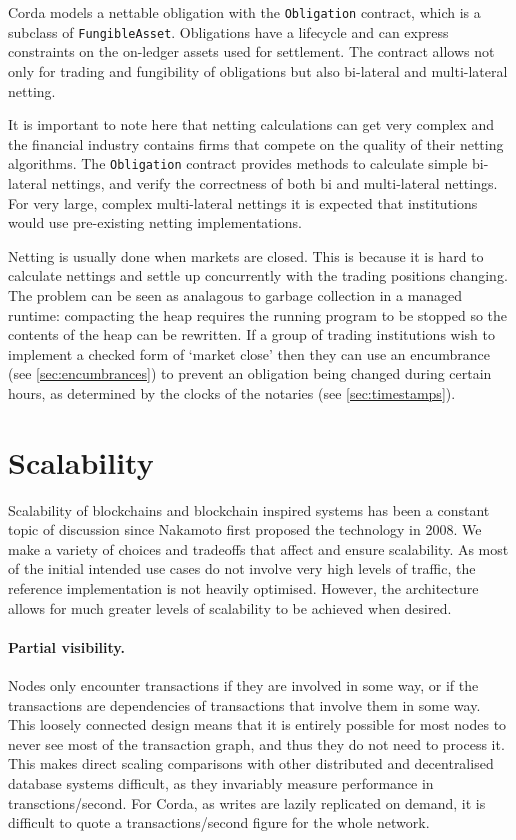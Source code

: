 \documentclass{article}
\begin{document}
Corda models a nettable obligation with the \texttt{Obligation} contract, which is a subclass of
\texttt{FungibleAsset}. Obligations have a lifecycle and can express constraints on the on-ledger assets used
for settlement. The contract allows not only for trading and fungibility of obligations but also bi-lateral and
multi-lateral netting.

It is important to note here that netting calculations can get very complex and the financial industry contains
firms that compete on the quality of their netting algorithms. The \texttt{Obligation} contract provides methods
to calculate  simple bi-lateral nettings, and verify the correctness of both bi and multi-lateral nettings. For
very large, complex multi-lateral nettings it is expected that institutions would use pre-existing netting
implementations.

Netting is usually done when markets are closed. This is because it is hard to calculate nettings and settle up
concurrently with the trading positions changing. The problem can be seen as analagous to garbage collection in
a managed runtime: compacting the heap requires the running program to be stopped so the contents of the heap
can be rewritten. If a group of trading institutions wish to implement a checked form of `market close' then they
can use an encumbrance (see \cref{sec:encumbrances}) to prevent an obligation being changed during certain hours,
as determined by the clocks of the notaries (see \cref{sec:timestamps}).

\section{Scalability}

Scalability of blockchains and blockchain inspired systems has been a constant topic of discussion since Nakamoto
first proposed the technology in 2008. We make a variety of choices and tradeoffs that affect and
ensure scalability. As most of the initial intended use cases do not involve very high levels of traffic, the
reference implementation is not heavily optimised. However, the architecture allows for much greater levels of
scalability to be achieved when desired.

\paragraph{Partial visibility.}Nodes only encounter transactions if they are involved in some way, or if the
transactions are dependencies of transactions that involve them in some way. This loosely connected
design means that it is entirely possible for most nodes to never see most of the transaction graph, and thus
they do not need to process it. This makes direct scaling comparisons with other distributed and
decentralised database systems difficult, as they invariably measure performance in transctions/second.
For Corda, as writes are lazily replicated on demand, it is difficult to quote a transactions/second figure for
the whole network.
\end{document}
